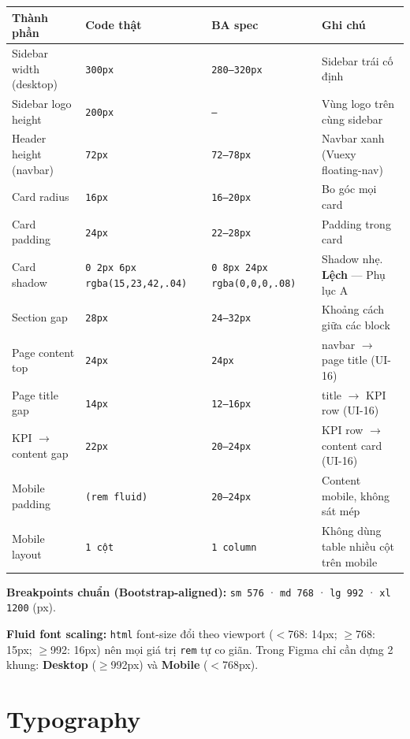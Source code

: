 \documentclass[11pt,a4paper]{article}
\begin{document}
\begin{tabularx}{\textwidth}{@{}l l l Y@{}}
\toprule
\textbf{Thành phần} & \textbf{Code thật} & \textbf{BA spec} & \textbf{Ghi chú}\\
\midrule
\endhead
Sidebar width (desktop)   & \texttt{300px}  & \texttt{280--320px} & Sidebar trái cố định\\
Sidebar logo height       & \texttt{200px}  & \texttt{--}         & Vùng logo trên cùng sidebar\\
Header height (navbar)     & \texttt{72px}   & \texttt{72--78px}   & Navbar xanh (Vuexy floating-nav)\\
Card radius               & \texttt{16px}   & \texttt{16--20px}   & Bo góc mọi card\\
Card padding              & \texttt{24px}   & \texttt{22--28px}   & Padding trong card\\
Card shadow               & \texttt{0 2px 6px rgba(15,23,42,.04)} & \texttt{0 8px 24px rgba(0,0,0,.08)} & Shadow nhẹ. \textbf{Lệch} — Phụ lục A\\
Section gap               & \texttt{28px}   & \texttt{24--32px}   & Khoảng cách giữa các block\\
Page content top          & \texttt{24px}   & \texttt{24px}       & navbar $\rightarrow$ page title (UI-16)\\
Page title gap            & \texttt{14px}   & \texttt{12--16px}   & title $\rightarrow$ KPI row (UI-16)\\
KPI $\rightarrow$ content gap & \texttt{22px} & \texttt{20--24px}  & KPI row $\rightarrow$ content card (UI-16)\\
Mobile padding            & \texttt{(rem fluid)} & \texttt{20--24px} & Content mobile, không sát mép\\
Mobile layout             & \texttt{1 cột}  & \texttt{1 column}   & Không dùng table nhiều cột trên mobile\\
\bottomrule
\end{tabularx}

\textbf{Breakpoints chuẩn (Bootstrap-aligned):} \texttt{sm 576} · \texttt{md 768} · \texttt{lg 992} · \texttt{xl 1200} (px).

\textbf{Fluid font scaling:} \texttt{html} font-size đổi theo viewport ($<$768: 14px; $\ge$768: 15px; $\ge$992: 16px)
nên mọi giá trị \texttt{rem} tự co giãn. Trong Figma chỉ cần dựng 2 khung: \textbf{Desktop} ($\ge$992px) và
\textbf{Mobile} ($<$768px).

\section{Typography}
\end{document}
